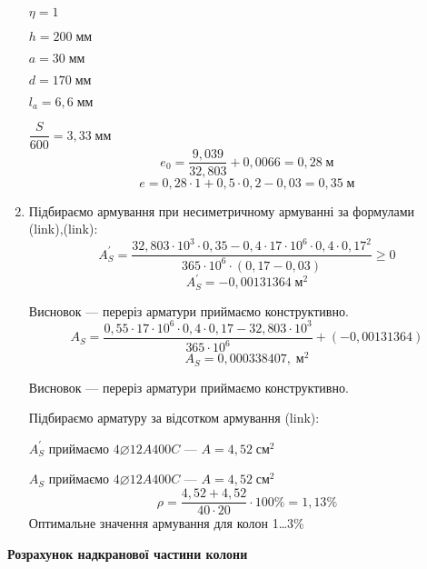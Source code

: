 \documentclass[a4paper,14pt]{article}
\begin{document}
\begin{enumerate}
        $\eta = 1$

        $h = 200\;\textit{мм}$

        $a = 30\;\textit{мм}$

        $d = 170\;\textit{мм}$

        $l_a = 6,6\;\textit{мм}$

        $\dfrac{S}{600} = 3,33\;\textit{мм}$
        $$e_0 = \frac{9,039}{32,803} + 0,0066 = 0,28\;\textit{м}$$
        $$e = 0,28 \cdot 1 +  0,5 \cdot 0,2 - 0,03 = 0,35\;\textit{м}$$
    \item Підбираємо армування при несиметричному армуванні за формулами\\(link),(link):
        $$A_S^\prime = \frac{32,803 \cdot 10^3 \cdot 0,35 - 0,4 \cdot 17 \cdot 10^6 \cdot 0,4 \cdot 0,17^2}{365 \cdot 10^6 \cdot (0,17 - 0,03)} \geqslant 0$$
        $$A_S^\prime = -0,00131364\;\textit{м}^2$$

        Висновок --- переріз арматури приймаємо конструктивно.
        $$A_S = \frac{0,55 \cdot 17 \cdot 10^6 \cdot 0,4 \cdot 0,17 - 32,803 \cdot 10^3}{365 \cdot 10^6} +(-0,00131364)$$
        $$A_S = 0,000338407,\;\textit{м}^2$$

        Висновок --- переріз арматури приймаємо конструктивно.

        Підбираємо арматуру за відсотком армування (link):

        $A_S^\prime$ приймаємо $4\varnothing12A400C$ --- $A = 4,52\;\textit{см}^2$

        $A_S$ приймаємо $4\varnothing12A400C$ --- $A = 4,52\;\textit{см}^2$
        $$\rho = \frac{4,52 + 4,52}{40 \cdot 20} \cdot 100\% = 1,13\%$$
        Оптимальне значення армування для колон 1\ldots 3\%
\end{enumerate}
\textbf{Розрахунок надкранової частини колони} %
\end{document}
